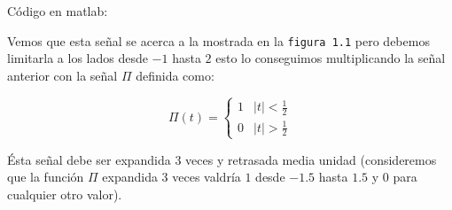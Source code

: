 \documentclass[10pt,a4paper]{report}
\begin{document}
Código en matlab:



Vemos que esta señal se acerca a la mostrada en la \texttt{figura 1.1} pero debemos limitarla a los lados desde $ -1 $ hasta $2$ esto lo conseguimos multiplicando la señal anterior con la señal $\Pi$ definida como:

\[ \Pi(t) = \left\{
              \begin{array}{lc}
                1&\left|t\right|<\frac12\\
                0&\left|t\right|>\frac12
              \end{array}
            \right. \]

Ésta señal debe ser expandida 3 veces y retrasada media unidad (consideremos que la función $\Pi$ expandida 3 veces  valdría $1$ desde $-1.5$ hasta $1.5$ y $0$ para cualquier otro valor).
\end{document}

